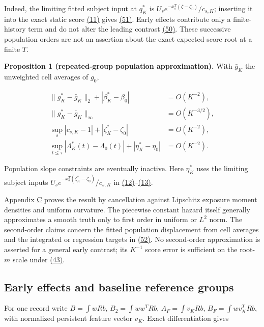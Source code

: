 \documentclass[11pt]{article}
\begin{document}
Indeed, the limiting fitted subject input at \(q_K^*\) is \(U_s e^{-x_s^T(\zeta-\zeta_0)}/c_{s,K}\); inserting it into the exact static score \hyperref[eq:11]{(11)} gives \hyperref[eq:51]{(51)}. Early effects contribute only a finite-history term and do not alter the leading contrast \hyperref[eq:50]{(50)}. These successive population orders are not an assertion about the exact expected-score root at a finite \(T\).

\label{res:Proposition-1}
\textbf{Proposition 1 (repeated-group population approximation).} With \(\bar g_K\) the unweighted cell averages of \(g_0\),

\begin{equation*}
\begin{aligned}
\|g_K^*-\bar g_K\|_2+|\beta_K^*-\beta_0|&=O(K^{-2}),\\
\|g_K^*-\bar g_K\|_\infty&=O(K^{-3/2}),\\
\sup_s|c_{s,K}-1|+|\zeta_K^*-\zeta_0|&=O(K^{-2}),\\
\sup_{t\leq\tau}|\Lambda_K^*(t)-\Lambda_0(t)|+|\eta_K^*-\eta_0|&=O(K^{-2}).
\end{aligned}\tag{52}\label{eq:52}
\end{equation*}

Population slope constraints are eventually inactive. Here \(\eta_K^*\) uses the limiting subject inputs \(U_s e^{-x_s^T(\zeta_K^*-\zeta_0)}/c_{s,K}\) in \hyperref[eq:12]{(12)}--\hyperref[eq:13]{(13)}.

Appendix \hyperref[sec:C]{C} proves the result by cancellation against Lipschitz exposure moment densities and uniform curvature. The piecewise constant hazard itself generally approximates a smooth truth only to first order in uniform or \(L^2\) norm. The second-order claims concern the fitted population displacement from cell averages and the integrated or regression targets in \hyperref[eq:52]{(52)}. No second-order approximation is asserted for a general early contrast; its \(K^{-1}\) score error is sufficient on the root-\(m\) scale under \hyperref[eq:43]{(43)}.

\subsection{Early effects and baseline reference groups}\label{sec:4.4}

For one record write \(B=\int wRb\), \(B_2=\int ww^TRb\),
\(A_F=\int v_KRb\), \(B_F=\int wv_K^TRb\), with normalized persistent feature vector \(v_K\). Exact differentiation gives
\end{document}
